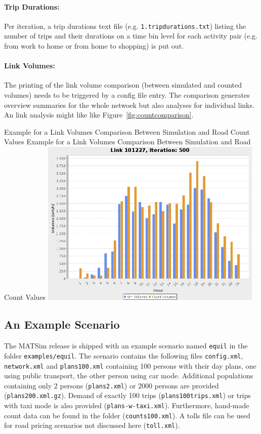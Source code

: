 \paragraph{Trip Durations:}
Per iteration, a trip durations text file (e.g. \lstinline|1.tripdurations.txt|) listing the number of trips and their durations on a time bin level for each activity pair (e.g. from work to home or from home to shopping) is put out.

\paragraph{Link Volumes:}
The printing of the link volume comparison (between simulated and counted volumes) needs to be triggered by a config file entry. The comparison generates overview summaries for the whole netwoek but also analyses for individual links. An link analysis might like like Figure~\ref{fig:countcomparison}.

\createfigure%
{Example for a Link Volumes Comparison Between Simulation and Road Count Values}%
{Example for a Link Volumes Comparison Between Simulation and Road Count Values}%
{\label{fig:countcomparison}}%
{\includegraphics[width=0.8\textwidth, angle=0]{using/figures/link101227.png}}%
{}


\subsection{An Example Scenario}
The MATSim release is shipped with an example scenario named \lstinline|equil| in the folder \lstinline|examples/equil|. The scenario contains the following files \lstinline|config.xml|, \lstinline|network.xml| and \lstinline|plans100.xml| containing 100 persons with their day plans, one using public transport, the other person using car mode. Additional populations containing only 2 persons (\lstinline|plans2.xml|) or 2000 persons are provided (\lstinline|plans200.xml.gz|). Demand of exactly 100 trips (\lstinline|plans100trips.xml|) or trips with taxi mode is also provided (\lstinline|plans-w-taxi.xml|). Furthermore, hand-made count data can be found in the folder (\lstinline|counts100.xml|). A tolls file can be used for road pricing scenarios not discussed here (\lstinline|toll.xml|).

